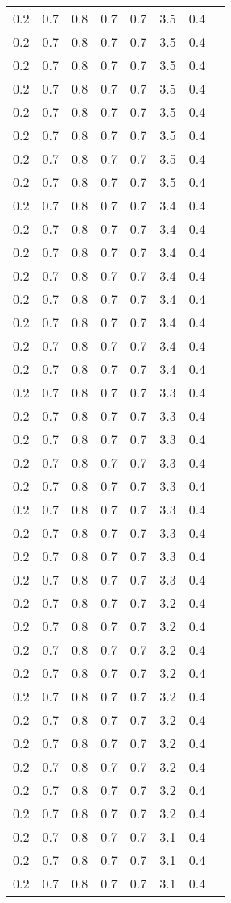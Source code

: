 \begin{tabular}{L{1in}|L{1in}|L{1in}|L{1in}|L{1in}|L{1in}|L{1in}|L{1in}}
0.2&0.7&0.8&0.7&0.7&3.5&0.4\\
0.2&0.7&0.8&0.7&0.7&3.5&0.4\\
0.2&0.7&0.8&0.7&0.7&3.5&0.4\\
0.2&0.7&0.8&0.7&0.7&3.5&0.4\\
0.2&0.7&0.8&0.7&0.7&3.5&0.4\\
0.2&0.7&0.8&0.7&0.7&3.5&0.4\\
0.2&0.7&0.8&0.7&0.7&3.5&0.4\\
0.2&0.7&0.8&0.7&0.7&3.5&0.4\\
0.2&0.7&0.8&0.7&0.7&3.4&0.4\\
0.2&0.7&0.8&0.7&0.7&3.4&0.4\\
0.2&0.7&0.8&0.7&0.7&3.4&0.4\\
0.2&0.7&0.8&0.7&0.7&3.4&0.4\\
0.2&0.7&0.8&0.7&0.7&3.4&0.4\\
0.2&0.7&0.8&0.7&0.7&3.4&0.4\\
0.2&0.7&0.8&0.7&0.7&3.4&0.4\\
0.2&0.7&0.8&0.7&0.7&3.4&0.4\\
0.2&0.7&0.8&0.7&0.7&3.3&0.4\\
0.2&0.7&0.8&0.7&0.7&3.3&0.4\\
0.2&0.7&0.8&0.7&0.7&3.3&0.4\\
0.2&0.7&0.8&0.7&0.7&3.3&0.4\\
0.2&0.7&0.8&0.7&0.7&3.3&0.4\\
0.2&0.7&0.8&0.7&0.7&3.3&0.4\\
0.2&0.7&0.8&0.7&0.7&3.3&0.4\\
0.2&0.7&0.8&0.7&0.7&3.3&0.4\\
0.2&0.7&0.8&0.7&0.7&3.3&0.4\\
0.2&0.7&0.8&0.7&0.7&3.2&0.4\\
0.2&0.7&0.8&0.7&0.7&3.2&0.4\\
0.2&0.7&0.8&0.7&0.7&3.2&0.4\\
0.2&0.7&0.8&0.7&0.7&3.2&0.4\\
0.2&0.7&0.8&0.7&0.7&3.2&0.4\\
0.2&0.7&0.8&0.7&0.7&3.2&0.4\\
0.2&0.7&0.8&0.7&0.7&3.2&0.4\\
0.2&0.7&0.8&0.7&0.7&3.2&0.4\\
0.2&0.7&0.8&0.7&0.7&3.2&0.4\\
0.2&0.7&0.8&0.7&0.7&3.2&0.4\\
0.2&0.7&0.8&0.7&0.7&3.1&0.4\\
0.2&0.7&0.8&0.7&0.7&3.1&0.4\\
0.2&0.7&0.8&0.7&0.7&3.1&0.4\\

\end{tabular}
